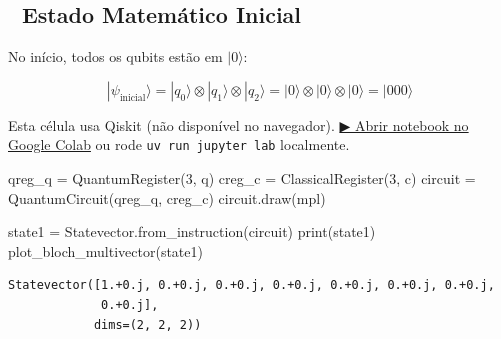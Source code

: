 \documentclass[
  brazilian,
]{report}
\newenvironment{Shaded}{\begin{snugshade}}{\end{snugshade}}
\newcommand{\BuiltInTok}[1]{\textcolor[rgb]{0.00,0.23,0.31}{#1}}
\newcommand{\DecValTok}[1]{\textcolor[rgb]{0.68,0.00,0.00}{#1}}
\newcommand{\NormalTok}[1]{\textcolor[rgb]{0.00,0.23,0.31}{#1}}
\newcommand{\OperatorTok}[1]{\textcolor[rgb]{0.37,0.37,0.37}{#1}}
\newcommand{\StringTok}[1]{\textcolor[rgb]{0.13,0.47,0.30}{#1}}
\begin{document}
\subsection{📐 Estado Matemático
Inicial}\label{estado-matemuxe1tico-inicial}

No início, todos os qubits estão em \(|0\rangle\):

\[|\psi_{\text{inicial}}\rangle = |q_0\rangle \otimes |q_1\rangle \otimes |q_2\rangle = |0\rangle \otimes |0\rangle \otimes |0\rangle = |000\rangle\]

\begin{tcolorbox}[enhanced jigsaw, arc=.35mm, bottomrule=.15mm, bottomtitle=1mm, breakable, colback=white, colbacktitle=quarto-callout-warning-color!10!white, colframe=quarto-callout-warning-color-frame, coltitle=black, left=2mm, leftrule=.75mm, opacityback=0, opacitybacktitle=0.6, rightrule=.15mm, title=\textcolor{quarto-callout-warning-color}{\faExclamationTriangle}\hspace{0.5em}{⚛️ Célula Qiskit --- execute no Colab ou localmente}, titlerule=0mm, toprule=.15mm, toptitle=1mm]

Esta célula usa Qiskit (não disponível no navegador).
\href{https://colab.research.google.com/github/maxwellamaral/aula-quantum/blob/main/notebooks/02-teletransport.ipynb}{▶
Abrir notebook no Google Colab} ou rode \texttt{uv\ run\ jupyter\ lab}
localmente.

\begin{Shaded}
\begin{Highlighting}[]


\NormalTok{qreg\_q }\OperatorTok{=}\NormalTok{ QuantumRegister(}\DecValTok{3}\NormalTok{, }\StringTok{\textquotesingle{}q\textquotesingle{}}\NormalTok{)}
\NormalTok{creg\_c }\OperatorTok{=}\NormalTok{ ClassicalRegister(}\DecValTok{3}\NormalTok{, }\StringTok{\textquotesingle{}c\textquotesingle{}}\NormalTok{)}
\NormalTok{circuit }\OperatorTok{=}\NormalTok{ QuantumCircuit(qreg\_q, creg\_c)}
\NormalTok{circuit.draw(}\StringTok{\textquotesingle{}mpl\textquotesingle{}}\NormalTok{)}

\NormalTok{state1 }\OperatorTok{=}\NormalTok{ Statevector.from\_instruction(circuit)}
\BuiltInTok{print}\NormalTok{(state1)}
\NormalTok{plot\_bloch\_multivector(state1)}
\end{Highlighting}
\end{Shaded}

\end{tcolorbox}

\begin{verbatim}
Statevector([1.+0.j, 0.+0.j, 0.+0.j, 0.+0.j, 0.+0.j, 0.+0.j, 0.+0.j,
             0.+0.j],
            dims=(2, 2, 2))
\end{verbatim}
\end{document}
